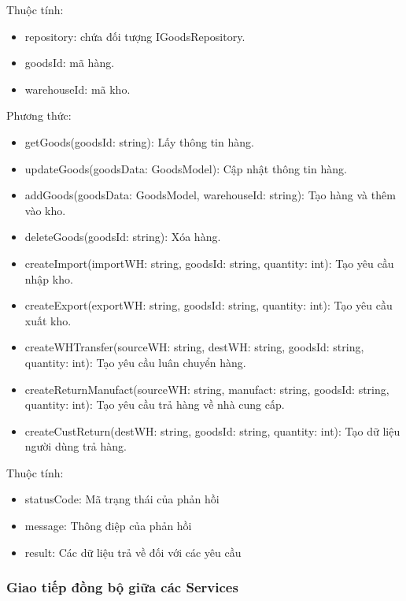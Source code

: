 Thuộc tính:
\begin{itemize}
	\item repository: chứa đối tượng IGoodsRepository.
	\item goodsId: mã hàng.
	\item warehouseId: mã kho.
\end{itemize}
Phương thức:
\begin{itemize}
	\item getGoods(goodsId: string): Lấy thông tin hàng.
	\item updateGoods(goodsData: GoodsModel): Cập nhật thông tin hàng.
	\item addGoods(goodsData: GoodsModel, warehouseId: string): Tạo hàng và thêm vào kho.
	\item deleteGoods(goodsId: string): Xóa hàng.
	\item createImport(importWH: string, goodsId: string, quantity: int): Tạo yêu cầu nhập kho.
	\item createExport(exportWH: string, goodsId: string, quantity: int): Tạo yêu cầu xuất kho.
	\item createWHTransfer(sourceWH: string, destWH: string, goodsId: string, quantity: int): Tạo yêu cầu luân chuyển hàng.
	\item createReturnManufact(sourceWH: string, manufact: string, goodsId: string, quantity: int): Tạo yêu cầu trả hàng về nhà cung cấp.
	\item createCustReturn(destWH: string, goodsId: string, quantity: int): Tạo dữ liệu người dùng trả hàng.
\end{itemize}

Thuộc tính:
\begin{itemize}
	\item statusCode: Mã trạng thái của phản hồi
	\item message: Thông điệp của phản hồi
	\item result: Các dữ liệu trả về đối với các yêu cầu
\end{itemize}


\newpage



\subsubsection{Giao tiếp đồng bộ giữa các Services}

